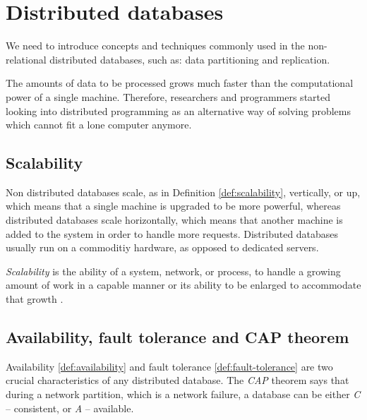 
\section{Distributed databases}\label{sec:theory:distDbs}
We need to introduce concepts and techniques commonly used in the non-relational distributed databases, such as: data partitioning and replication.

The amounts of data to be processed grows much faster than the computational power of a single machine. Therefore, researchers and programmers started looking into distributed programming as an alternative way of solving problems which cannot fit a lone computer anymore. 


\subsection{Scalability}
Non distributed databases scale, as in Definition \ref{def:scalability}, vertically, or up, which means that a single machine is upgraded to be more powerful, whereas distributed databases scale horizontally, which means that another machine is added to the system in order to handle more requests. Distributed databases usually run on a commoditiy hardware, as opposed to dedicated servers.

\begin{definition}
  \label{def:scalability}
  \emph{Scalability} is the ability of a system, network, or process, to handle a growing amount of work in a capable manner or its ability to be enlarged to accommodate that growth \cite{DistributeSystemsForFunAndProfit}. 
\end{definition}


\subsection{Availability, fault tolerance and CAP theorem}
Availability \ref{def:availability} and fault tolerance \ref{def:fault-tolerance} are two crucial characteristics of any distributed database. The \emph{CAP} theorem \cite{brewer2000towards} \cite{Brewer:2012ba} says that during a network partition, which is a network failure, a database can be either \emph{C} -- consistent, or \emph{A} -- available. 

